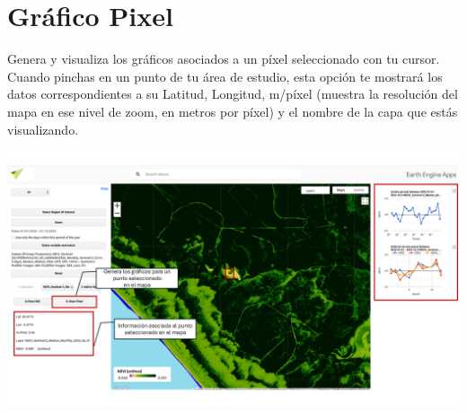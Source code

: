 \documentclass[
]{book}
\begin{document}
\section{\texorpdfstring{\textbf{Gráfico Pixel}}{Gráfico Pixel}}\label{gruxe1fico-pixel}

Genera y visualiza los gráficos asociados a un píxel seleccionado con tu cursor. Cuando pinchas en un punto de tu área de estudio, esta opción te mostrará los datos correspondientes a su Latitud, Longitud, m/píxel (muestra la resolución del mapa en ese nivel de zoom, en metros por píxel) y el nombre de la capa que estás visualizando.

\includegraphics{assets/chart_pixel_es.png}

  
\end{document}
